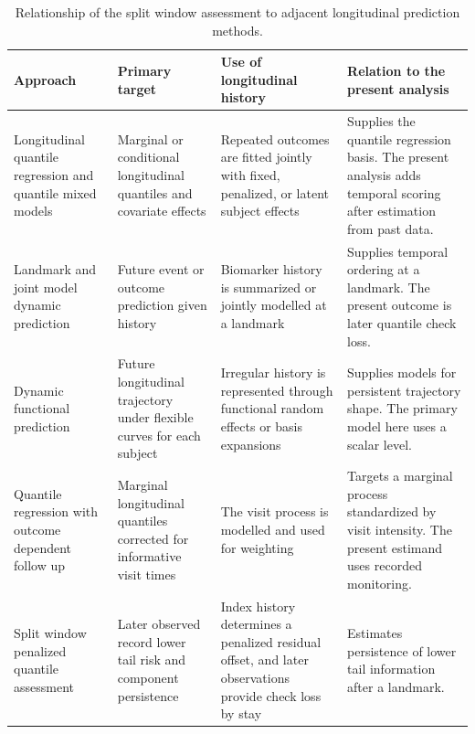 \begin{table}[!htbp]
\caption{Relationship of the split window assessment to adjacent longitudinal prediction methods.}
\label{tab:prior_method_map}
\centering
\scriptsize
\setlength{\tabcolsep}{3pt}
\renewcommand{\arraystretch}{1.10}
\begin{tabular}{>{\raggedright\arraybackslash}p{}>{\raggedright\arraybackslash}p{}>{\raggedright\arraybackslash}p{}>{\raggedright\arraybackslash}p{}}
\toprule
Approach & Primary target & Use of longitudinal history & Relation to the present analysis\\
\midrule
Longitudinal quantile regression and quantile mixed models & Marginal or conditional longitudinal quantiles and covariate effects & Repeated outcomes are fitted jointly with fixed, penalized, or latent subject effects & Supplies the quantile regression basis. The present analysis adds temporal scoring after estimation from past data.\\
Landmark and joint model dynamic prediction & Future event or outcome prediction given history & Biomarker history is summarized or jointly modelled at a landmark & Supplies temporal ordering at a landmark. The present outcome is later quantile check loss.\\
Dynamic functional prediction & Future longitudinal trajectory under flexible curves for each subject & Irregular history is represented through functional random effects or basis expansions & Supplies models for persistent trajectory shape. The primary model here uses a scalar level.\\
Quantile regression with outcome dependent follow up & Marginal longitudinal quantiles corrected for informative visit times & The visit process is modelled and used for weighting & Targets a marginal process standardized by visit intensity. The present estimand uses recorded monitoring.\\
Split window penalized quantile assessment & Later observed record lower tail risk and component persistence & Index history determines a penalized residual offset, and later observations provide check loss by stay & Estimates persistence of lower tail information after a landmark.\\
\bottomrule
\end{tabular}
\end{table}

